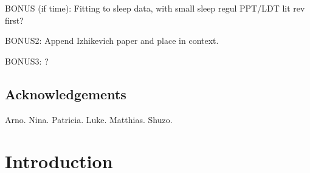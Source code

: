 \documentclass[mphil,deptreport,ai]{infthesis} %
\begin{document}
\begin{preliminary}
{BONUS (if time): Fitting to sleep data, with small sleep regul PPT/LDT lit rev first?

BONUS2: Append Izhikevich paper and place in context.

BONUS3: ?
}

\maketitle

\section*{Acknowledgements}
Arno.
Nina.
Patricia.
Luke.
Matthias.
Shuzo.

\tableofcontents
\end{preliminary}


\chapter{Introduction}





\end{document}
